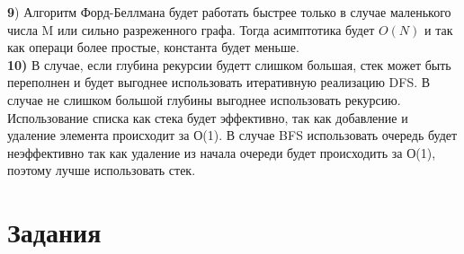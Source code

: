 \documentclass[a4paper, 14pt]{article}
\begin{document}
\textbf{9}) Алгоритм Форд-Беллмана будет работать быстрее только в случае маленького числа M или сильно разреженного графа. Тогда асимптотика будет $O(N) $ и так как операци более простые, константа будет меньше. \\

\textbf{10)} В случае, если глубина рекурсии будетт слишком большая, стек может быть переполнен и будет выгоднее использовать итеративную реализацию DFS. В случае не слишком большой глубины выгоднее использовать рекурсию. Использование списка как стека будет эффективно, так как добавление и удаление элемента происходит за О(1). В случае BFS использовать очередь будет неэффективно так как удаление из начала очереди будет происходить за О(1), поэтому лучше использовать стек.  
\clearpage
\section{Задания}
\end{document}
